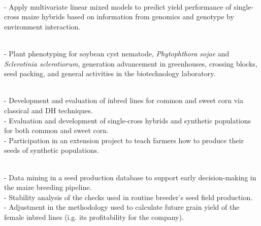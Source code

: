 \documentclass[]{deedy-resume-openfont}
\begin{document}
\begin{minipage}[t]{1\textwidth}
\sectionsep
\vspace{0.2 mm}

 \\
- Apply multivariate linear mixed models to predict yield performance of single-cross maize hybrids based on information from genomics and genotype by environment interaction. 

\sectionsep
\vspace{0.2 mm}

 \\
- Plant phenotyping for soybean cyst nematode, \textit{Phytophthora sojae} and \textit{Sclerotinia sclerotiorum}, generation advancement in greenhouses, crossing blocks, seed packing, and general activities in the biotechnology laboratory.

\sectionsep
\vspace{0.2 mm}

 \\
- Development and evaluation of inbred lines for common and sweet corn via classical and DH techniques. \\
- Evaluation and development of single-cross hybrids and synthetic populations for both common and sweet corn. \\
- Participation in an extension project to teach farmers how to produce their seeds of synthetic populations.

\sectionsep
\vspace{0.2 mm}

 \\
- Data mining in a seed production database to support early decision-making in the maize breeding pipeline. \\
- Stability analysis of the checks used in routine breeder's seed field production. \\
- Adjustment in the methodology used to calculate future grain yield of the female inbred lines (i.g. its profitability for the company). 


\end{minipage} 
\hfill
\end{document}

